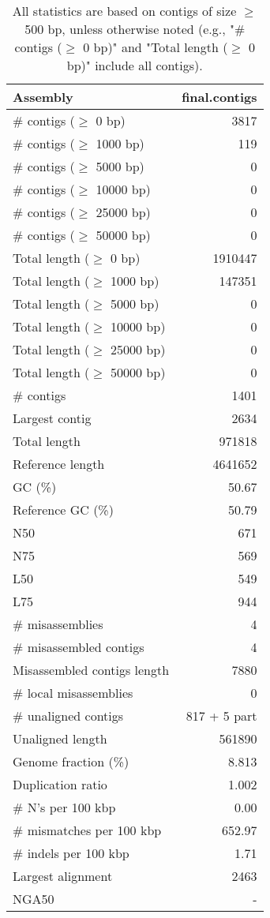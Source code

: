 \documentclass[12pt,a4paper]{article}
\begin{document}
\begin{table}[ht]
\begin{center}
\caption{All statistics are based on contigs of size $\geq$ 500 bp, unless otherwise noted (e.g., "\# contigs ($\geq$ 0 bp)" and "Total length ($\geq$ 0 bp)" include all contigs).}
\begin{tabular}{|l*{1}{|r}|}
\hline
Assembly & final.contigs \\ \hline
\# contigs ($\geq$ 0 bp) & 3817 \\ \hline
\# contigs ($\geq$ 1000 bp) & 119 \\ \hline
\# contigs ($\geq$ 5000 bp) & 0 \\ \hline
\# contigs ($\geq$ 10000 bp) & 0 \\ \hline
\# contigs ($\geq$ 25000 bp) & 0 \\ \hline
\# contigs ($\geq$ 50000 bp) & 0 \\ \hline
Total length ($\geq$ 0 bp) & 1910447 \\ \hline
Total length ($\geq$ 1000 bp) & 147351 \\ \hline
Total length ($\geq$ 5000 bp) & 0 \\ \hline
Total length ($\geq$ 10000 bp) & 0 \\ \hline
Total length ($\geq$ 25000 bp) & 0 \\ \hline
Total length ($\geq$ 50000 bp) & 0 \\ \hline
\# contigs & 1401 \\ \hline
Largest contig & 2634 \\ \hline
Total length & 971818 \\ \hline
Reference length & 4641652 \\ \hline
GC (\%) & 50.67 \\ \hline
Reference GC (\%) & 50.79 \\ \hline
N50 & 671 \\ \hline
N75 & 569 \\ \hline
L50 & 549 \\ \hline
L75 & 944 \\ \hline
\# misassemblies & 4 \\ \hline
\# misassembled contigs & 4 \\ \hline
Misassembled contigs length & 7880 \\ \hline
\# local misassemblies & 0 \\ \hline
\# unaligned contigs & 817 + 5 part \\ \hline
Unaligned length & 561890 \\ \hline
Genome fraction (\%) & 8.813 \\ \hline
Duplication ratio & 1.002 \\ \hline
\# N's per 100 kbp & 0.00 \\ \hline
\# mismatches per 100 kbp & 652.97 \\ \hline
\# indels per 100 kbp & 1.71 \\ \hline
Largest alignment & 2463 \\ \hline
NGA50 & - \\ \hline
\end{tabular}
\end{center}
\end{table}
\end{document}
